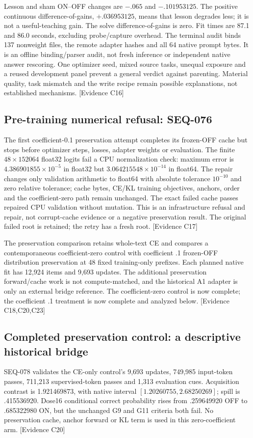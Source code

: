 \documentclass[11pt]{article}
\newcommand{\ev}[1]{\textsf{[Evidence #1]}}
\begin{document}
Lesson and sham ON--OFF changes are $-.065$ and $-.101953125$. The positive
continuous difference-of-gains, $+.036953125$, means that lesson degrades less;
it is not a useful-teaching gain. The solve difference-of-gains is zero.
Fit times are 87.1 and 86.0 seconds, excluding probe/capture overhead. The
terminal audit binds 137 nonweight files, the remote adapter hashes and all
64 native prompt bytes. It is an offline binding/parser audit, not fresh
inference or independent native answer rescoring. One optimizer seed, mixed
source tasks, unequal exposure and a reused development panel prevent a
general verdict against parenting. Material quality, task mismatch and the
write recipe remain possible explanations, not established mechanisms. \ev{C16}

\subsection{Pre-training numerical refusal: SEQ-076}
The first coefficient-0.1 preservation attempt completes its frozen-OFF cache
but stops before optimizer steps, losses, adapter weights or evaluation. The
finite $48\times152064$ float32 logits fail a CPU normalization check: maximum
error is $4.386901855\times10^{-5}$ in float32 but
$3.064215548\times10^{-14}$ in float64. The repair changes only validation
arithmetic to float64 with absolute tolerance $10^{-10}$ and zero relative
tolerance; cache bytes, CE/KL training objectives, anchors, order and the
coefficient-zero path remain unchanged. The exact failed cache passes repaired
CPU validation without mutation. This is an infrastructure refusal and repair,
not corrupt-cache evidence or a negative preservation result. The original
failed root is retained; the retry has a fresh root. \ev{C17}

The preservation comparison retains whole-text CE and compares a
contemporaneous coefficient-zero control with coefficient .1 frozen-OFF
distribution preservation at 48 fixed training-only prefixes. Each planned
native fit has 12,924 items and 9,693 updates. The additional preservation
forward/cache work is not compute-matched, and the historical A1 adapter is
only an external bridge reference. The coefficient-zero control is now complete;
the coefficient .1 treatment is now complete and analyzed below. \ev{C18,C20,C23}

\subsection{Completed preservation control: a descriptive historical bridge}
SEQ-078 validates the CE-only control's 9,693 updates, 749,985 input-token passes,
711,213 supervised-token passes and 1,313 evaluation cues. Acquisition contrast
is 1.921469873, with native interval $[1.20260755,2.68250269]$; spill is
.415536920. Dose16 conditional correct probability rises from .259649920 OFF
to .685322980 ON, but the unchanged G9 and G11 criteria both fail. No preservation
cache, anchor forward or KL term is used in this zero-coefficient arm. \ev{C20}
\end{document}
